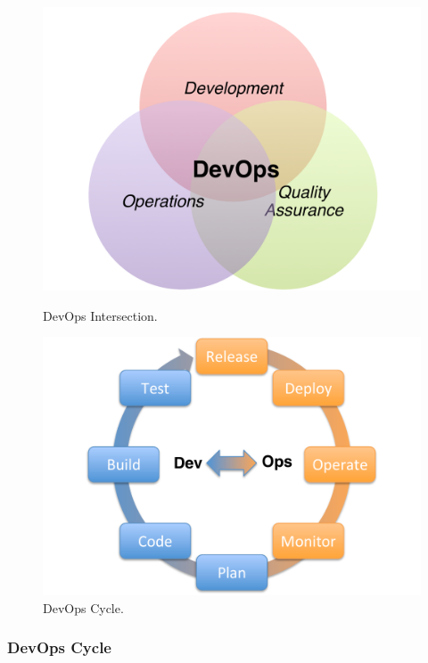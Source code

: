 \documentclass{article}
\begin{document}
\begin{figure}[htb]
  \centering
   \begin{minipage}{.5\textwidth}
    \includegraphics[width=1.0\textwidth]{images/devops.pdf}
    \caption{DevOps Intersection.}
    \label{F:devops}
  \end{minipage}%
   \begin{minipage}{.5\textwidth}
     \includegraphics[width=1.0\textwidth]{images/devops-circle.pdf}
     \caption{DevOps Cycle.}
     \label{F:devops-circel}
  \end{minipage}%
\end{figure}

\subsubsection{DevOps Cycle}
\end{document}

